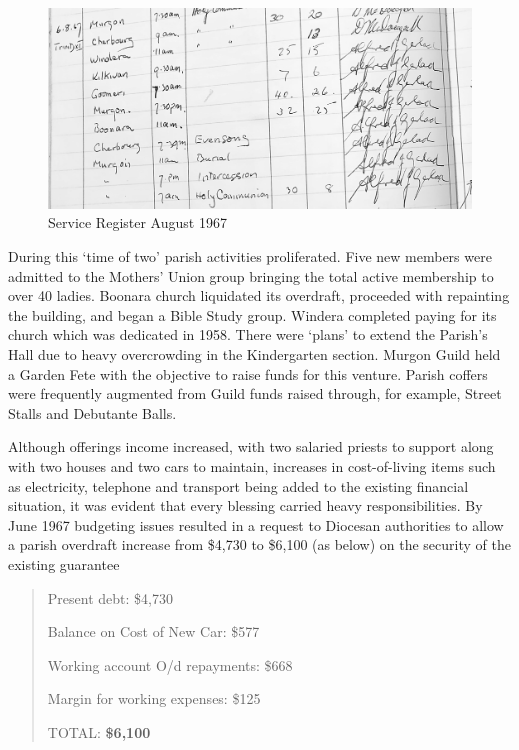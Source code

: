 \begin{figure}[!htb]
\begin{center}
\includegraphics[width=1.\textwidth,center]{../images/serviceRegisterAug1967.jpg}
\caption{Service Register August 1967}
\end{center}
\end{figure}




During this `time of two' parish activities proliferated. Five new members were admitted to the Mothers' Union group bringing the total active membership to over 40 ladies. Boonara church liquidated its overdraft, proceeded with repainting the building, and began a Bible Study group. Windera completed paying for its church which was dedicated in 1958. There were `plans' to extend the Parish's Hall due to heavy overcrowding in the Kindergarten section. Murgon Guild held a Garden Fete with the objective to raise funds for this venture. Parish coffers were frequently augmented from Guild funds raised through, for example, Street Stalls and Debutante Balls.



Although offerings income increased, with two salaried priests to support along with two houses and two cars to maintain, increases in cost-of-living items such as electricity, telephone and transport being added to the existing financial situation, it was evident that every blessing carried heavy responsibilities. By June 1967 budgeting issues resulted in a request to Diocesan authorities to allow a parish overdraft increase from \$4,730 to \$6,100 (as below) on the security of the existing guarantee



\begin{quote}

Present debt: \$4,730



Balance on Cost of New Car: \$577



Working account O/d repayments: \$668



Margin for working expenses: \$125



TOTAL: \textbf{\$6,100}

\end{quote}




